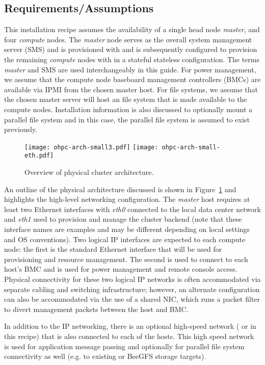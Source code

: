 \subsection{Requirements/Assumptions}
This installation recipe assumes the availability of a single head node {\em
 master}, and four {\em compute} nodes. The {\em master} node serves as the
overall system management server (SMS) and is provisioned with \baseOS{} and is
subsequently configured to provision the remaining {\em compute} nodes with
\provisioner{} in a
 stateful \else stateless \fi
configuration. The terms {\em master} and SMS are
used interchangeably in this guide. For power management, we assume that
the compute node baseboard management controllers (BMCs) are available via IPMI
from the chosen master host. For file systems, we assume that the chosen master
server will host an \NFS{} file system that is made available to the compute
nodes.
Installation information is also discussed to optionally mount a
parallel file system and in this case, the parallel file system is assumed to
exist previously.
\fi

\begin{figure}[hbt]
\center
{}
\texttt{[image: ohpc-arch-small3.pdf]}
\fi
{}
\texttt{[image: ohpc-arch-small-eth.pdf]}
\fi
\vspace*{-0.2cm}
\caption{Overview of physical cluster architecture.} \label{fig:physical_arch}
\end{figure}
\mbox{}

\vspace*{0.5cm}

An outline of the physical architecture discussed is shown in
Figure~\ref{fig:physical_arch} and highlights the high-level networking
configuration. The {\em master} host requires at least two Ethernet interfaces
with {\em eth0} connected to the local data center network and {\em eth1} used
to provision and manage the cluster backend (note that these interface names
are examples and may be different depending on local settings and OS
conventions). Two logical IP interfaces are expected to each compute node: the
first is the standard Ethernet interface that will be used for provisioning and
resource management. The second is used to connect to each host's BMC and is
used for power management and remote console access. Physical connectivity for
these two logical IP networks is often accommodated via separate cabling and
switching infrastructure; however, an alternate configuration can also be
accommodated via the use of a shared NIC, which runs a packet filter to divert
management packets between the host and BMC.

In addition to the IP networking, there is an optional high-speed network
(\InfiniBand{} or \OmniPath{} in this recipe) that is also connected to each of the
hosts. This high speed network is used for application message passing and
optionally for parallel file system connectivity as well (e.g. to
existing \Lustre{} or BeeGFS storage targets).
\fi
